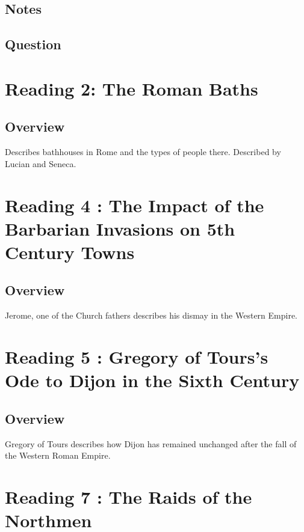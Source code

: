 \documentclass[12pt]{article}
\begin{document}
\subsection*{Notes}

\subsection*{Question}

\section*{Reading 2: The Roman Baths}

\subsection*{Overview}

Describes bathhouses in Rome and the types of people there. Described by Lucian and Seneca.

\section*{Reading 4 : The Impact of the Barbarian Invasions on 5th Century Towns}

\subsection*{Overview}

Jerome, one of the Church fathers describes his dismay in the Western Empire.\\

\section*{Reading 5 : Gregory of Tours's Ode to Dijon in the Sixth Century}

\subsection*{Overview}

Gregory of Tours describes how Dijon has remained unchanged after the fall of the Western Roman Empire.\\

\section*{Reading 7 : The Raids of the Northmen}
\end{document}

